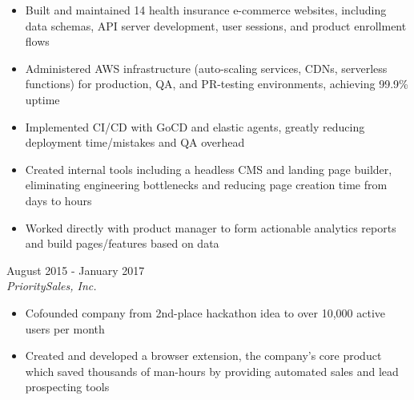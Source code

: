 \documentclass{resume}
\begin{document}
\begin{spacing}{1.2}
\begin{paracol}{2}
		\nointerlineskip
		\begin{itemize}
			\item Built and maintained 14 health insurance e-commerce websites, including data schemas, API server development, user sessions, and product enrollment flows
			\item Administered AWS infrastructure (auto-scaling services, CDNs, serverless functions) for production, QA, and PR-testing environments, achieving 99.9\% uptime
			\item Implemented CI/CD with GoCD and elastic agents, greatly reducing deployment time/mistakes and QA overhead
			\item Created internal tools including a headless CMS and landing page builder, eliminating engineering bottlenecks and reducing page creation time from days to hours
			\item Worked directly with product manager to form actionable analytics reports and build pages/features based on data
		\end{itemize}

		\medskip

		{\large{}}
		\hfill{\color{subcontent} August 2015 - January 2017}\\
		\textit{PrioritySales, Inc.}

		\nointerlineskip
		\begin{itemize}
			\item Cofounded company from 2nd-place hackathon idea to over 10,000 active users per month
			\item Created and developed a browser extension, the company’s core product which saved thousands of man-hours by providing automated sales and lead prospecting tools
		\end{itemize}
	\end{paracol}
\end{spacing}
\end{document}
